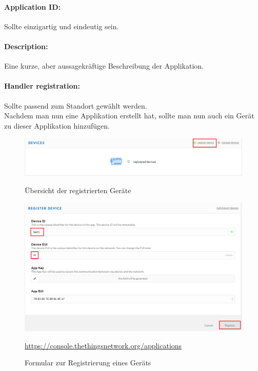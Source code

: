 \paragraph{Application ID:} Sollte einzigartig und eindeutig sein.
\paragraph{Description:} Eine kurze, aber aussagekräftige Beschreibung der Applikation.
\paragraph{Handler registration:} Sollte passend zum Standort gewählt werden.\\
Nachdem man nun eine Applikation erstellt hat, sollte man nun auch ein Gerät zu dieser Applikation hinzufügen.
\begin{figure}[ht]
    \center
    \includegraphics[width=16cm]{Bilder/lora-4.png}\\
    \caption{Übersicht der registrierten Geräte}
\end{figure}
\begin{figure}[ht]
    \center
    \includegraphics[width=16cm]{Bilder/lora-5.png}\\
    \caption{Formular zur Registrierung eines Geräts}
    \begin{center} \quelle\url{https://console.thethingsnetwork.org/applications} \end{center}
\end{figure}
\newpage
